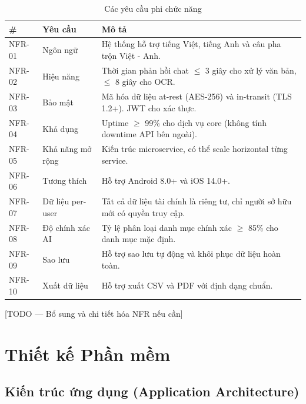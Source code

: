 \begin{table}[htbp]
\centering
\begin{tabularx}{\textwidth}{|l|l|X|}
\hline
\textbf{\#} & \textbf{Yêu cầu} & \textbf{Mô tả} \\ \hline
NFR-01 & Ngôn ngữ & Hệ thống hỗ trợ tiếng Việt, tiếng Anh và câu pha trộn Việt - Anh. \\ \hline
NFR-02 & Hiệu năng & Thời gian phản hồi chat $\le$ 3 giây cho xử lý văn bản, $\le$ 8 giây cho OCR. \\ \hline
NFR-03 & Bảo mật & Mã hóa dữ liệu at-rest (AES-256) và in-transit (TLS 1.2+). JWT cho xác thực. \\ \hline
NFR-04 & Khả dụng & Uptime $\ge$ 99\% cho dịch vụ core (không tính downtime API bên ngoài). \\ \hline
NFR-05 & Khả năng mở rộng & Kiến trúc microservice, có thể scale horizontal từng service. \\ \hline
NFR-06 & Tương thích & Hỗ trợ Android 8.0+ và iOS 14.0+. \\ \hline
NFR-07 & Dữ liệu per-user & Tất cả dữ liệu tài chính là riêng tư, chỉ người sở hữu mới có quyền truy cập. \\ \hline
NFR-08 & Độ chính xác AI & Tỷ lệ phân loại danh mục chính xác $\ge$ 85\% cho danh mục mặc định. \\ \hline
NFR-09 & Sao lưu & Hỗ trợ sao lưu tự động và khôi phục dữ liệu hoàn toàn. \\ \hline
NFR-10 & Xuất dữ liệu & Hỗ trợ xuất CSV và PDF với định dạng chuẩn. \\ \hline
\end{tabularx}
\caption{Các yêu cầu phi chức năng}
\label{tab:nfr}
\end{table}

\vspace{0.5cm}
[TODO --- Bổ sung và chi tiết hóa NFR nếu cần]

\section{Thiết kế Phần mềm}
\label{sec:software_design}

\subsection{Kiến trúc ứng dụng (Application Architecture)}
\label{subsec:app_architecture}

